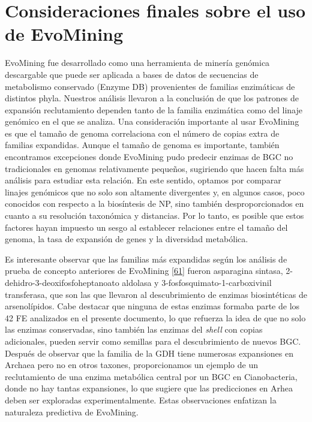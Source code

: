 \documentclass[12pt,twoside]{reedthesis}
\begin{document}
  \section{Consideraciones finales sobre el uso de
  EvoMining}\label{consideraciones-finales-sobre-el-uso-de-evomining}
  
  EvoMining fue desarrollado como una herramienta de minería genómica
  descargable que puede ser aplicada a bases de datos de secuencias de
  metabolismo conservado (Enzyme DB) provenientes de familias enzimáticas
  de distintos phyla. Nuestros análisis llevaron a la conclusión de que
  los patrones de expansión reclutamiento dependen tanto de la familia
  enzimática como del linaje genómico en el que se analiza. Una
  consideración importante al usar EvoMining es que el tamaño de genoma
  correlaciona con el número de copias extra de familias expandidas.
  Aunque el tamaño de genoma es importante, también encontramos
  excepciones donde EvoMining pudo predecir enzimas de BGC no
  tradicionales en genomas relativamente pequeños, sugiriendo que hacen
  falta más análisis para estudiar esta relación. En este sentido, optamos
  por comparar linajes genómicos que no solo son altamente divergentes y,
  en algunos casos, poco conocidos con respecto a la biosíntesis de NP,
  sino también desproporcionados en cuanto a su resolución taxonómica y
  distancias. Por lo tanto, es posible que estos factores hayan impuesto
  un sesgo al establecer relaciones entre el tamaño del genoma, la tasa de
  expansión de genes y la diversidad metabólica.
  
  Es interesante observar que las familias más expandidas según los
  análisis de prueba de concepto anteriores de EvoMining
  {[}\protect\hyperlink{ref-cruz-morales_phylogenomic_2016}{61}{]} fueron
  asparagina sintasa, 2-dehidro-3-deoxifosfoheptanoato aldolasa y
  3-fosfosquimato-1-carboxivinil transferasa, que son las que llevaron al
  descubrimiento de enzimas biosintéticas de arsenolípidos. Cabe destacar
  que ninguna de estas enzimas formaba parte de los 42 FE analizados en el
  presente documento, lo que refuerza la idea de que no solo las enzimas
  conservadas, sino también las enzimas del \emph{shell} con copias
  adicionales, pueden servir como semillas para el descubrimiento de
  nuevos BGC. Después de observar que la familia de la GDH tiene numerosas
  expansiones en Archaea pero no en otros taxones, proporcionamos un
  ejemplo de un reclutamiento de una enzima metabólica central por un BGC
  en Cianobacteria, donde no hay tantas expansiones, lo que sugiere que
  las predicciones en Arhea deben ser exploradas experimentalmente. Estas
  observaciones enfatizan la naturaleza predictiva de EvoMining.
  
\end{document}
